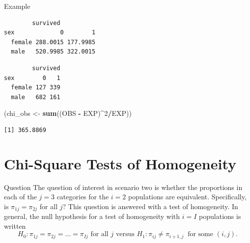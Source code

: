 \documentclass[
  ignorenonframetext,
]{beamer}
\newenvironment{Shaded}{\begin{snugshade}}{\end{snugshade}}
\newcommand{\DecValTok}[1]{\textcolor[rgb]{0.00,0.00,0.81}{#1}}
\newcommand{\FunctionTok}[1]{\textcolor[rgb]{0.13,0.29,0.53}{\textbf{#1}}}
\newcommand{\NormalTok}[1]{#1}
\newcommand{\OtherTok}[1]{\textcolor[rgb]{0.56,0.35,0.01}{#1}}
\newcommand{\SpecialCharTok}[1]{\textcolor[rgb]{0.81,0.36,0.00}{\textbf{#1}}}
\begin{document}
\begin{frame}[fragile]{Example}
\protect\hypertarget{example-1}{}
\begin{Shaded}
\end{Shaded}

\begin{verbatim}
        survived
sex             0        1
  female 288.0015 177.9985
  male   520.9985 322.0015
\end{verbatim}

\begin{Shaded}
\end{Shaded}

\begin{verbatim}
        survived
sex        0   1
  female 127 339
  male   682 161
\end{verbatim}

\begin{Shaded}
\begin{Highlighting}[]
\NormalTok{(chi\_obs }\OtherTok{\textless{}{-}} \FunctionTok{sum}\NormalTok{((OBS }\SpecialCharTok{{-}}\NormalTok{ EXP)}\SpecialCharTok{\^{}}\DecValTok{2}\SpecialCharTok{/}\NormalTok{EXP))}
\end{Highlighting}
\end{Shaded}

\begin{verbatim}
[1] 365.8869
\end{verbatim}
\end{frame}

\hypertarget{chi-square-tests-of-homogeneity}{%
\section{Chi-Square Tests of
Homogeneity}\label{chi-square-tests-of-homogeneity}}

\begin{frame}{Question}
\protect\hypertarget{question}{}
The question of interest in scenario two is whether the proportions in
each of the \(j=3\) categories for the \(i=2\) populations are
equivalent. Specifically, is \(\pi_{1j} = \pi_{2j}\) for all \(j\)? This
question is answered with a test of homogeneity. In general, the null
hypothesis for a test of homogeneity with \(i=I\) populations is written
\begin{equation}
 H_0: \pi_{1j}=\pi_{2j} = \dots = \pi_{Ij}\text{ for all } j \text{ versus } H_1:
\pi_{ij} \ne \pi_{i+1, j} \: \text{ for some } (i, j).
\end{equation}
\end{frame}
\end{document}

